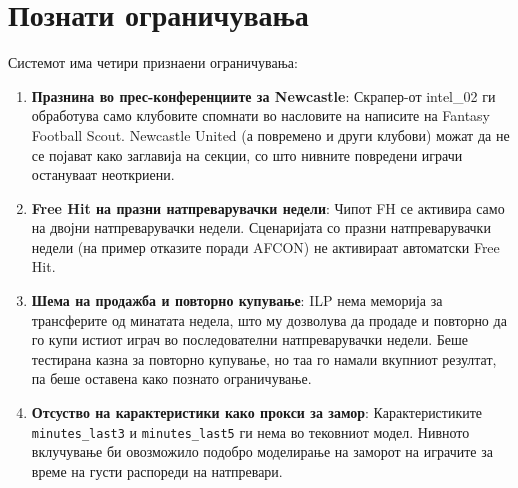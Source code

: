 \section{Познати ограничувања}

Системот има четири признаени ограничувања:

\begin{enumerate}
  \item \textbf{Празнина во прес-конференциите за Newcastle}: Скрапер-от intel\_02 ги обработува само клубовите спомнати во насловите на написите на Fantasy Football Scout. Newcastle United (а повремено и други клубови) можат да не се појават како заглавија на секции, со што нивните повредени играчи остануваат неоткриени.

  \item \textbf{Free Hit на празни натпреварувачки недели}: Чипот FH се активира само на двојни натпреварувачки недели. Сценаријата со празни натпреварувачки недели (на пример отказите поради AFCON) не активираат автоматски Free Hit.

  \item \textbf{Шема на продажба и повторно купување}: ILP нема меморија за трансферите од минатата недела, што му дозволува да продаде и повторно да го купи истиот играч во последователни натпреварувачки недели. Беше тестирана казна за повторно купување, но таа го намали вкупниот резултат, па беше оставена како познато ограничување.

  \item \textbf{Отсуство на карактеристики како прокси за замор}: Карактеристиките \texttt{minutes\_last3} и \texttt{minutes\_last5} ги нема во тековниот модел. Нивното вклучување би овозможило подобро моделирање на заморот на играчите за време на густи распореди на натпревари.
\end{enumerate}
